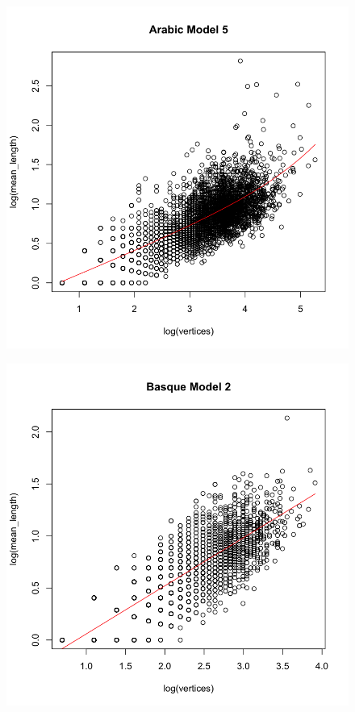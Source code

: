 \documentclass[paper=a4, fontsize=11pt]{scrartcl} %
\begin{document}
\newpage
\captionsetup{justification=centering,margin=.2cm}

\begin{figure}
\centering
\begin{minipage}{.5\textwidth}
  \centering
  \includegraphics[width=\linewidth]{bestModel_Arabic.png}
  \label{fig:1}
\end{minipage}%
\begin{minipage}{.5\textwidth}
  \centering
  \includegraphics[width=\linewidth]{bestModel_Basque.png}

\end{minipage}
\end{figure}
\end{document}
